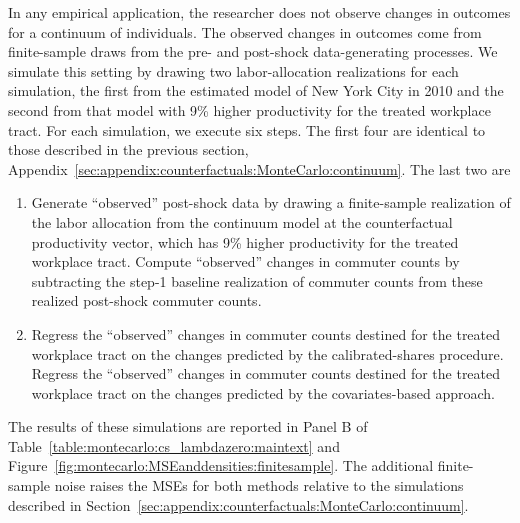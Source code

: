 \documentclass[11pt]{article}
\theoremstyle{definition}
\begin{document}
In any empirical application,
the researcher does not observe changes in outcomes for a continuum of individuals.
The observed changes in outcomes come from finite-sample draws from the pre- and post-shock data-generating processes.
We simulate this setting by drawing two labor-allocation realizations for each simulation,
the first from the estimated model of New York City in 2010 
and
the second from that model with 9\% higher productivity for the treated workplace tract.
For each simulation, we execute six steps.
The first four are identical to those described in the previous section, Appendix~\ref{sec:appendix:counterfactuals:MonteCarlo:continuum}.
The last two are
\begin{enumerate}\itemsep0em \addtocounter{enumi}{4}
\item 
Generate ``observed'' post-shock data by drawing a finite-sample realization of the labor allocation from the continuum model at the counterfactual productivity vector,
which has 9\% higher productivity for the treated workplace tract.
Compute ``observed'' changes in commuter counts by subtracting the step-1 baseline realization of commuter counts from these realized post-shock commuter counts.
\item 
Regress the ``observed'' changes in commuter counts destined for the treated workplace tract on the changes predicted by the calibrated-shares procedure.
Regress the ``observed'' changes in commuter counts destined for the treated workplace tract on the changes predicted by the covariates-based approach.
\end{enumerate}

The results of these simulations are reported in 
Panel B of Table~\ref{table:montecarlo:cs_lambdazero:maintext}
and
Figure~\ref{fig:montecarlo:MSEanddensities:finitesample}.
The additional finite-sample noise raises the MSEs for both methods relative to 
the simulations described in Section~\ref{sec:appendix:counterfactuals:MonteCarlo:continuum}.
\end{document}
